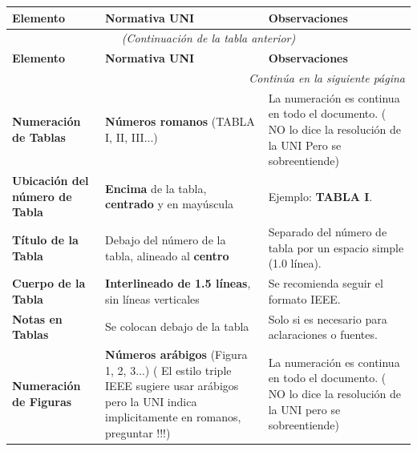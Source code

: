 \documentclass{report}
\newcommand{\greencheck}{{\color{green}\ding{51}}} %
\begin{document}
\begin{longtable}{|p{5cm}|p{5cm}|p{8cm}|}
    \hline
    \textbf{Elemento} & \textbf{Normativa UNI} & \textbf{Observaciones} \\ \hline
    \endfirsthead

    \multicolumn{3}{c}{{\textit{(Continuación de la tabla anterior)}}} \\ \hline
    \textbf{Elemento} & \textbf{Normativa UNI} & \textbf{Observaciones} \\ \hline
    \endhead

    \hline \multicolumn{3}{|r|}{{\textit{Continúa en la siguiente página}}} \\ \hline
    \endfoot

    \hline
    \endlastfoot

    \textbf{Numeración de Tablas} \greencheck & \textbf{Números romanos} (TABLA I, II, III...) & La numeración es continua en todo el documento. ({\color{blue} NO lo dice la resolución de la UNI Pero se sobreentiende}) \\ \hline

    \textbf{Ubicación del número de Tabla} \greencheck & \textbf{Encima} de la tabla, \textbf{centrado} y en mayúscula & Ejemplo: \textbf{TABLA I}. \\ \hline

    \textbf{Título de la Tabla} \greencheck & Debajo del número de la tabla, alineado al \textbf{centro} & Separado del número de tabla por un espacio simple (1.0 línea). \\ \hline

    \textbf{Cuerpo de la Tabla} \greencheck & \textbf{Interlineado de 1.5 líneas}, sin líneas verticales & Se recomienda seguir el formato IEEE. \\ \hline

    \textbf{Notas en Tablas} \greencheck & Se colocan debajo de la tabla & Solo si es necesario para aclaraciones o fuentes. \\ \hline

    \textbf{Numeración de Figuras}  & \textbf{Números arábigos} (Figura 1, 2, 3...) ({\color{blue} El estilo triple IEEE sugiere usar arábigos pero la UNI indica implicitamente en romanos, preguntar !!!}) & La numeración es continua en todo el documento. ({\color{blue} NO lo dice la resolución de la UNI pero se sobreentiende}) \\ \hline


\end{longtable}
\end{document}
